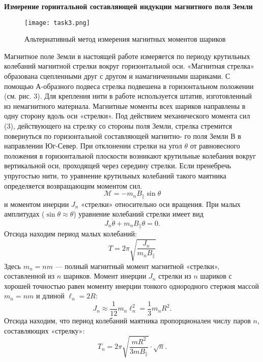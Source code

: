 \documentclass[12pt,a4paper]{article}
\begin{document}
\textbf{Измерение горинтальной составляющей индукции магнитного поля Земли}
\begin{figure}[h!]
	\begin{center}
		\texttt{[image: task3.png]}
		\caption{Альтернативный метод измерения магнитных моментов шариков}
		\label{fig:facility}
	\end{center}
\end{figure}
    Магнитное поле Земли в настоящей работе измеряется по периоду крутильных колебаний магнитной стрелки вокруг горизонтальной оси.
«Магнитная стрелка» образована сцепленными друг с другом и намагниченными шариками. С помощью А-образного подвеса стрелка подвешена в 
горизонтальном положении (см. рис. 3). Для крепления нити в работе используется штатив, изготовленный из немагнитного материала.
Магнитные моменты всех шариков направлены в одну сторону вдоль оси «стрелки». Под действием механического момента сил (3), действующего на 
стрелку со стороны поля Земли, стрелка стремится повернуться по горизонтальной составляющей магнитно- го поля Земли В в направлении Юг-Север. 
    При отклонении стрелки на угол $\theta$ от равновесного положения в горизонтальной плоскости возникают крутильные колебания вокруг 
вертикальной оси, проходящей через середину стрелки. Если пренебречь упругостью нити, то уравнение крутильных колебаний такого маятника 
определяется возвращающим моментом сил.
\[
\mathcal{M} = - m_n B_{\parallel} \sin{\theta}
\]
и моментом инерции \(J_n\) «стрелки» относительно оси вращения. При малых амплитудах (\(\sin \theta \approx \theta\)) уравнение колебаний стрелки имеет вид
\[
J_n \ddot{\theta} + m_n B_{\parallel} \theta = 0.
\]
Отсюда находим период малых колебаний:
\[
T = 2\pi \sqrt{\frac{J_n}{m_n B_{\parallel}}} \tag{13}
\]
Здесь \(m_n = n m\) — полный магнитный момент магнитной «стрелки», составленной из \(n\) шариков. Момент инерции \(J_n\) стрелки из \(n\) шариков с хорошей точностью равен моменту инерции тонкого однородного стержня массой \(m_n = n m\) и длиной \(\ell_n = 2R\):
\[
J_n \approx \frac{1}{12} m_n \ell_n^2 = \frac{1}{3} m_n R^2.
\]
Отсюда находим, что период колебаний маятника пропорционален числу паров \(n\), составляющих «стрелку»:
\[
T_n = 2\pi \sqrt{\frac{m R^2}{3 m B_{\parallel}}} \cdot \sqrt{n}. \tag{15}
\]
\end{document}
